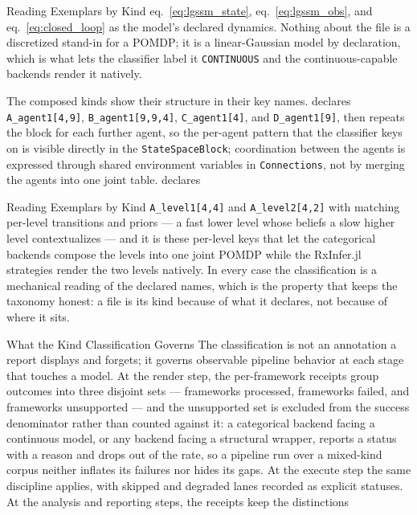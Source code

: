 \documentclass[
  ignorenonframetext,
]{beamer}
\begin{document}
\begin{frame}{Reading Exemplars by Kind}
eq.~\ref{eq:lgssm_state}, eq.~\ref{eq:lgssm_obs}, and
eq.~\ref{eq:closed_loop} as the model's declared dynamics. Nothing about
the file is a discretized stand-in for a POMDP; it is a linear-Gaussian
model by declaration, which is what lets the classifier label it
\texttt{CONTINUOUS} and the continuous-capable backends render it
natively.

The composed kinds show their structure in their key names.
 declares
\texttt{A\_agent1{[}4,9{]}}, \texttt{B\_agent1{[}9,9,4{]}},
\texttt{C\_agent1{[}4{]}}, and \texttt{D\_agent1{[}9{]}}, then repeats
the block for each further agent, so the per-agent pattern that the
classifier keys on is visible directly in the \texttt{StateSpaceBlock};
coordination between the agents is expressed through shared environment
variables in \texttt{Connections}, not by merging the agents into one
joint table.
 declares
\end{frame}

\begin{frame}{Reading Exemplars by Kind}
\texttt{A\_level1{[}4,4{]}} and \texttt{A\_level2{[}4,2{]}} with
matching per-level transitions and priors --- a fast lower level whose
beliefs a slow higher level contextualizes --- and it is these per-level
keys that let the categorical backends compose the levels into one joint
POMDP while the RxInfer.jl strategies render the two levels natively. In
every case the classification is a mechanical reading of the declared
names, which is the property that keeps the taxonomy honest: a file is
its kind because of what it declares, not because of where it sits.
\end{frame}

\begin{frame}{What the Kind Classification
Governs}
\protect{}\label{what-the-kind-classification-governs}
The classification is not an annotation a report displays and forgets;
it governs observable pipeline behavior at each stage that touches a
model. At the render step, the per-framework receipts group outcomes
into three disjoint sets --- frameworks processed, frameworks failed,
and frameworks unsupported --- and the unsupported set is excluded from
the success denominator rather than counted against it: a categorical
backend facing a continuous model, or any backend facing a structural
wrapper, reports a status with a reason and drops out of the rate, so a
pipeline run over a mixed-kind corpus neither inflates its failures nor
hides its gaps. At the execute step the same discipline applies, with
skipped and degraded lanes recorded as explicit statuses. At the
analysis and reporting steps, the receipts keep the distinctions
\end{frame}
\end{document}
